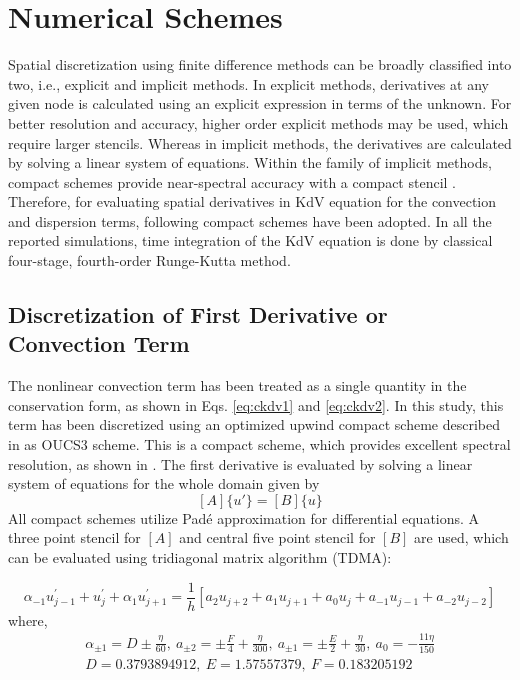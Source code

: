 \section{Numerical Schemes}
\label{sec:num_sch}
Spatial discretization using finite difference methods can be broadly classified into two, i.e., explicit and implicit methods. In explicit methods, derivatives at any given node is calculated using an explicit expression in terms of the unknown. For better resolution and accuracy, higher order explicit methods may be used, which require larger stencils. Whereas in implicit methods, the derivatives are calculated by solving a linear system of equations. Within the family of implicit methods, compact schemes provide near-spectral accuracy with a compact stencil \cite{Sengupta2013a}. Therefore, for evaluating spatial derivatives in KdV equation for the convection and dispersion terms, following compact schemes have been adopted. In all the reported simulations, time integration of the KdV equation is done by classical four-stage, fourth-order Runge-Kutta method.

\subsection{Discretization of First Derivative or Convection Term}
\label{subsec:OUCS3}
The nonlinear convection term has been treated as a single quantity in the conservation form, as shown in Eqs. \eqref{eq:ckdv1} and \eqref{eq:ckdv2}. 
In this study, this term has been discretized using an optimized upwind compact scheme described in \cite{Sengupta2013a} as OUCS3 scheme. This is a 
compact scheme, which provides excellent spectral resolution, as shown in \cite{Sengupta2006b}. The first derivative is evaluated by solving a linear system of equations for the whole domain given by
$$ [A]\{u'\} = [B]\{u\} $$
All compact schemes utilize Pad\'e approximation for differential equations. A three point stencil for $[A]$ and central five point stencil for $[B]$ are used, which can be evaluated using tridiagonal matrix algorithm (TDMA):

\begin{equation}
\label{eq:oucs3}
\alpha_{-1}u_{j-1}^{\prime}+u_{j}^{\prime}+\alpha_{1}u_{j+1}^{\prime}=\frac{1}{h}[a_{2}u_{j+2}+a_{1}u_{j+1}+a_{0}u_{j}+a_{-1}u_{j-1}+a_{-2}u_{j-2}]
\end{equation}
where,
\begin{align*}
\alpha_{\pm1}=D\pm\frac{\eta}{60},\
a_{\pm2}=\pm\frac{F}{4}+\frac{\eta}{300},\
a_{\pm1}=\pm\frac{E}{2}+\frac{\eta}{30},\ a_{0}=-\frac{11\eta}{150}\\
D=0.3793894912,\
E=1.57557379,\
F=0.183205192
\end{align*}

